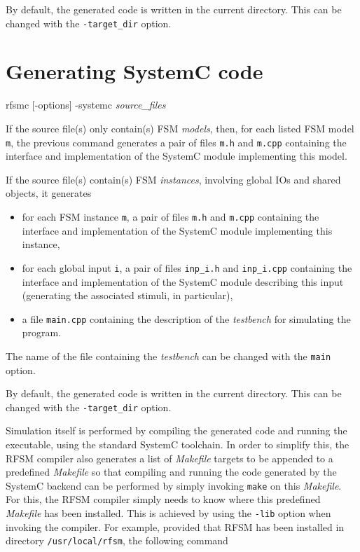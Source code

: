 By default, the generated code is written in the current directory. This can be changed with the
\verb|-target_dir| option.

\section{Generating SystemC code}
\label{sec:gener-syst-code}

\begin{FVerbatim}[commandchars=\\\{\}]
rfsmc [-options] -systemc \emph{source_files}
\end{FVerbatim}

If the source file(s) only contain(s) FSM \emph{models}, then, for each listed FSM model \texttt{m}, 
the previous command generates a pair of files \verb|m.h| and \verb|m.cpp| containing the
  interface and implementation of the SystemC module implementing this model.

\medskip
If the source file(s) contain(s) FSM \emph{instances}, involving global IOs
and shared objects, it generates
\begin{itemize}
\item for each FSM instance \verb|m|, a pair of files \verb|m.h| and \verb|m.cpp| containing the
  interface and implementation of the SystemC module implementing this instance,
\item for each global input \verb|i|, a pair of files \verb|inp_i.h|
  and \verb|inp_i.cpp| containing the interface and implementation of the SystemC module describing
  this input (generating the associated stimuli, in particular),
\item a file \verb|main.cpp| containing the description of the \emph{testbench} for simulating the
  program.
\end{itemize}

The name of the file containing the \emph{testbench} can be changed with the \verb|main| option.

\medskip
By default, the generated code is written in the current directory. This can be changed with the
\verb|-target_dir| option.

\medskip
Simulation itself is performed by compiling the generated code and running the executable,
using the standard SystemC toolchain.
In order to simplify this, the RFSM compiler also generates a list of \emph{Makefile} targets to be
appended to a predefined \emph{Makefile} so that compiling and running the code generated by the
SystemC backend can be performed by simply invoking \verb|make| on this \emph{Makefile}. For this,
the RFSM compiler simply needs to know where this predefined \emph{Makefile} has been
installed. This is achieved by using the \verb|-lib| option when invoking the compiler. For example,
provided that RFSM has been installed in directory \verb|/usr/local/rfsm|, the following command

